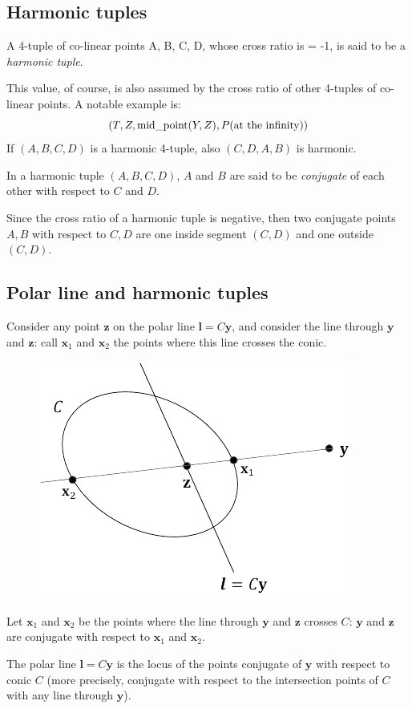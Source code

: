 \documentclass[12pt, a4paper]{report}
\begin{document}
    \subsection{Harmonic tuples}
    \begin{definition}
        A 4-tuple of co-linear points A, B, C, D, whose cross ratio is = -1, is said to be a \emph{harmonic tuple}. 
    \end{definition}
    This value, of course, is also assumed by the cross ratio of other 4-tuples of co-linear points. A notable example is: 
    \[\left( T,Z,\textnormal{mid\_point}(Y,Z),P(\textnormal{at the infinity}) \right)\]
    If $(A, B, C, D)$ is a harmonic 4-tuple, also $(C, D, A, B)$ is harmonic. 
    \begin{definition}
        In a harmonic tuple $(A, B, C, D)$, $A$ and $B$ are said to be \emph{conjugate} of each other with respect to $C$ and $D$.
    \end{definition}
    Since the cross ratio of a harmonic tuple is negative, then two conjugate points $A, B$ with respect to $C, D$ are one inside segment $(C,D)$ and one outside $(C,D)$. 

    \subsection{Polar line and harmonic tuples}
    Consider any point $\boldsymbol{z}$ on the polar line $\boldsymbol{l}=C\boldsymbol{y}$, and consider the line through $\boldsymbol{y}$ and $\boldsymbol{z}$: call $\boldsymbol{x}_1$ and
    $\boldsymbol{x}_2$ the points where this line crosses the conic. 
    \begin{figure}[H]
        \centering
        \includegraphics[width=0.5\linewidth]{images/polarharmonic.png}
    \end{figure}
    \begin{theorem}
        Let $\boldsymbol{x}_1$ and $\boldsymbol{x}_2$ be the points where the line through $\boldsymbol{y}$ and $\boldsymbol{z}$ crosses $C$: $\boldsymbol{y}$ and $\boldsymbol{z}$ are conjugate 
        with respect to $\boldsymbol{x}_1$ and $\boldsymbol{x}_2$.        
    \end{theorem}
    The polar line $\boldsymbol{l}=C\boldsymbol{y}$ is the locus of the points conjugate of $\boldsymbol{y}$ with respect to conic $C$ (more precisely, conjugate with respect to the 
    intersection points of $C$ with any line through $\boldsymbol{y}$). 
\end{document}
